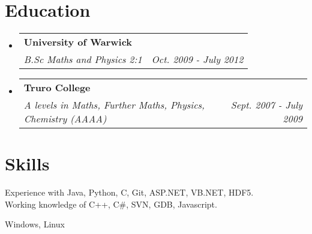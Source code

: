 \documentclass[11pt]{article}
\makeatletter
\newcommand{\cvheading}[3]{
    \begin{tabular*}{0.9\textwidth}[t]{l@{\extracolsep{\fill}}r}
        \textbf{#1}\\
        \textit{#2} & \textit{#3}\\
    \end{tabular*}\vspace{-5pt}
}
\makeatother
\begin{document}
\section{Education}
\begin{itemize}
    \item
        \cvheading
            {University of Warwick}
            {B.Sc Maths and Physics 2:1}{Oct. 2009 - July 2012}
    \item
        \cvheading
            {Truro College}
            {A levels in Maths, Further Maths, Physics, Chemistry (AAAA)}{Sept. 2007 - July 2009}
\end{itemize}


\section{Skills}
\begin{description}[style=nextline]
    \item[Technologies:]
            Experience with Java, Python, C, Git, ASP.NET, VB.NET, HDF5.\\
            Working knowledge of C++, C\#, SVN, GDB, Javascript.
    \item[Operating Systems:]
        {Windows, Linux}
\end{description}
\end{document}

